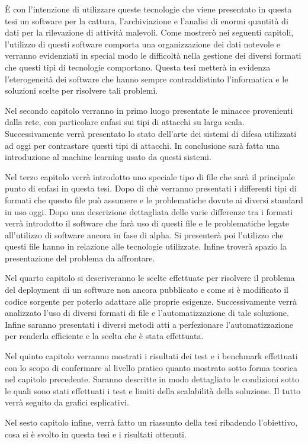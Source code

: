 \documentclass[../main.tex]{subfiles}
\begin{document}
È con l'intenzione di utilizzare queste tecnologie che viene presentato in questa tesi un software per la cattura, l'archiviazione e l'analisi di enormi quantità di dati per la rilevazione di attività malevoli. Come mostrerò nei seguenti capitoli, l'utilizzo di questi software comporta una organizzazione dei dati notevole e verranno evidenziati in special modo le difficoltà nella gestione dei diversi formati che questi tipi di tecnologie comportano. Questa tesi metterà in evidenza l'eterogeneità dei software che hanno sempre contraddistinto l'informatica e le soluzioni scelte per risolvere tali problemi.

Nel secondo capitolo verranno in primo luogo presentate le minacce provenienti dalla rete, con particolare enfasi sui tipi di attacchi su larga scala. Successivamente verrà presentato lo stato dell'arte dei sistemi di difesa utilizzati ad oggi per contrastare questi tipi di attacchi. In conclusione sarà fatta una introduzione al machine learning usato da questi sistemi.

Nel terzo capitolo verrà introdotto uno speciale tipo di file che sarà il principale punto di enfasi in questa tesi. Dopo di chè verranno presentati i differenti tipi di formati che questo file può assumere e le problematiche dovute ai diversi standard in uso oggi. Dopo una descrizione dettagliata delle varie differenze tra i formati verrà introdotto il software che farà uso di questi file e le problematiche legate all'utilizzo di software ancora in fase di alpha. Si presenterà poi l'utilizzo che questi file hanno in relazione alle tecnologie utilizzate. Infine troverà spazio la presentazione del problema da affrontare.


Nel quarto capitolo si descriveranno le scelte effettuate per risolvere il problema del deployment di un software non ancora pubblicato e come si è modificato il codice sorgente per poterlo adattare alle proprie esigenze. Successivamente verrà analizzato l'uso di diversi formati di file e l'automatizzazione di tale soluzione. Infine saranno presentati i diversi metodi atti a perfezionare l'automatizzazione per renderla efficiente e la scelta che è stata effettuata.

Nel quinto capitolo verranno mostrati i risultati dei test e i benchmark effettuati con lo scopo di confermare al livello pratico quanto mostrato sotto forma teorica nel capitolo precedente. Saranno descritte in modo dettagliato le condizioni sotto le quali sono stati effettuati i test e limiti della scalabilità della soluzione. Il tutto verrà seguito da grafici esplicativi.

Nel sesto capitolo infine, verrà fatto un riassunto della tesi ribadendo l'obiettivo, cosa si è svolto in questa tesi e i risultati ottenuti.
\end{document}
